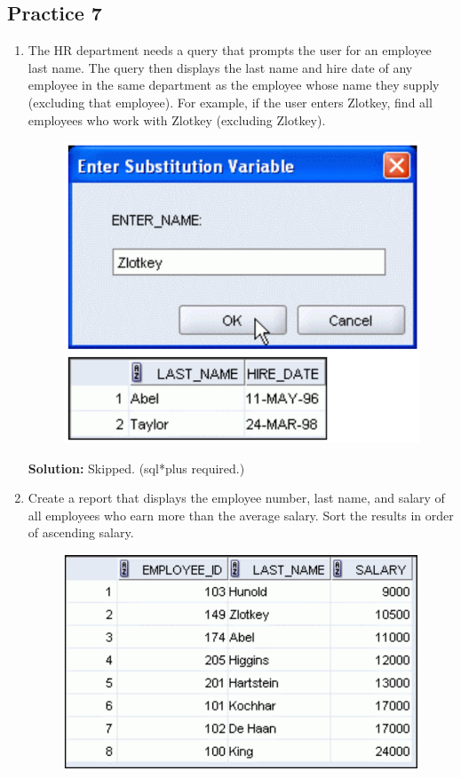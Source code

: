 \documentclass[a4paper,12pt]{article}
\begin{document}
\subsection*{Practice 7}
\begin{enumerate}
    \item The HR department needs a query that prompts the user for an employee last name. The query
then displays the last name and hire date of any employee in the same department as the
employee whose name they supply (excluding that employee). For example, if the user enters
Zlotkey, find all employees who work with Zlotkey (excluding Zlotkey).

    \begin{figure}[h]
        \centering
            \centering
            \includegraphics[width=.5\linewidth]{graphics/71.png}
    \end{figure}
    
    \textbf{Solution: } Skipped. (sql*plus required.)

        \item Create a report that displays the employee number, last name, and salary of all employees who
earn more than the average salary. Sort the results in order of ascending salary.
    \begin{figure}[h]
        \centering
            \centering
            \includegraphics[width=.6\linewidth]{graphics/72.png}
    \end{figure}
    

\end{enumerate}
\end{document}
